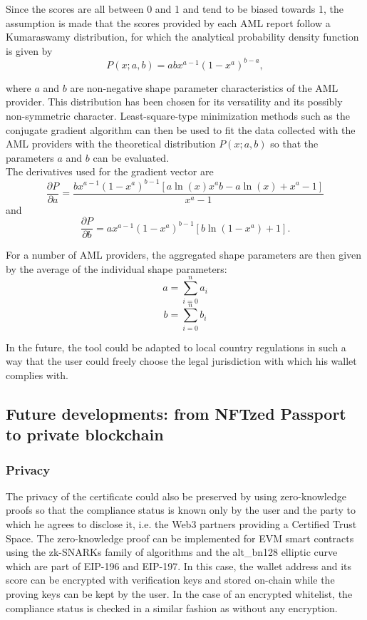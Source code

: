 ﻿\documentclass[a4paper]{article}
\begin{document}
Since the scores are all between 0 and 1 and tend to be biased towards 1, the assumption is made that the scores provided by each AML report follow a Kumaraswamy distribution, for which the analytical probability density function is given by
$$P(x; a,b)=abx^{a-1}\left(1-x^a\right)^{b-a},$$  

\noindent where $a$ and $b$ are non-negative shape parameter characteristics of the AML provider. This distribution has been chosen for its versatility and its possibly non-symmetric character.
Least-square-type minimization methods such as the conjugate gradient algorithm can then be used to fit the data collected with the AML providers with the theoretical distribution $P(x; a,b)$ so that the parameters $a$ and $b$ can be evaluated. \\

The derivatives used for the gradient vector are
$$\frac{\partial P}{\partial a}=\frac{bx^{a-1}\left(1-x^a\right)^{b-1}\left[a\ln(x)x^ab
-a\ln(x)+x^a-1\right]}{x^a-1}$$
and 
$$\frac{\partial P}{\partial b}=ax^{a-1}\left(1-x^a\right)^{b-1}\left[b\ln(1-x^a)+1\right].$$

For a number of AML providers, the aggregated shape parameters are then given by the average of the individual shape parameters:
$$a=\sum_{i=0}^na_i$$
$$b=\sum_{i=0}^nb_i$$  

In the future, the tool could be adapted to local country regulations in such a way that the user could freely choose the legal jurisdiction with which his wallet complies with.

\subsection{Future developments: from NFTzed Passport to private blockchain}
\subsubsection{Privacy}
The privacy of the certificate could also be preserved by using zero-knowledge proofs so that the compliance status is known only by the user and the party to which he agrees to disclose it, i.e. the Web3 partners providing a Certified Trust Space.  The zero-knowledge proof can be implemented for EVM smart contracts using the zk-SNARKs family of algorithms and the alt\_bn128 elliptic curve which are part of EIP-196 and EIP-197. In this case, the wallet address and its score can be encrypted with verification keys and stored on-chain while the proving keys can be kept by the user. In the case of an encrypted whitelist, the compliance status is checked in a similar fashion as without any encryption. \\
\end{document}
